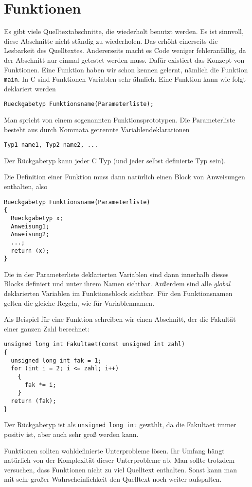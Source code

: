 \section{Funktionen}

Es gibt viele Quelltextabschnitte, die wiederholt benutzt werden.
Es ist sinnvoll, diese Abschnitte nicht ständig zu wiederholen.
Das erhöht einerseits die Lesbarkeit des Quelltextes.
Andererseits macht es Code weniger fehleranfällig, da der Abschnitt nur einmal getestet werden muss.
Dafür existiert das Konzept von Funktionen.
Eine Funktion haben wir schon kennen gelernt, nämlich die Funktion \verb|main|. 
In C sind Funktionen Variablen sehr ähnlich.
Eine Funktion kann wie folgt deklariert werden
\begin{lstlisting}
Rueckgabetyp Funktionsname(Parameterliste);
\end{lstlisting}
Man spricht von einem sogenannten Funktionsprototypen.
Die Parameterliste besteht aus durch Kommata getrennte Variablendeklarationen
\begin{lstlisting}
Typ1 name1, Typ2 name2, ...
\end{lstlisting}
Der Rückgabetyp kann jeder C Typ (und jeder selbst definierte Typ sein).

Die Definition einer Funktion muss dann natürlich einen Block von Anweisungen enthalten, also
\begin{lstlisting}
Rueckgabetyp Funktionsname(Parameterliste)
{
  Rueckgabetyp x;
  Anweisung1;
  Anweisung2;
  ...;
  return (x);
}
\end{lstlisting}
Die in der Parameterliste deklarierten Variablen sind dann innerhalb dieses Blocks definiert und unter ihrem Namen sichtbar.
Außerdem sind alle \emph{global} deklarierten Variablen im Funktionsblock sichtbar.
Für den Funktionsnamen gelten die gleiche Regeln, wie für Variablennamen.

Als Beispiel für eine Funktion schreiben wir einen Abschnitt, der die Fakultät einer ganzen Zahl berechnet:
\begin{lstlisting}
unsigned long int Fakultaet(const unsigned int zahl)
{
  unsigned long int fak = 1;
  for (int i = 2; i <= zahl; i++)
    {
      fak *= i;
    }
  return (fak);
}
\end{lstlisting}
Der Rückgabetyp ist als \verb|unsigned long int| gewählt, da die Fakultaet immer positiv ist, aber auch sehr groß werden kann.

Funktionen sollten wohldefinierte Unterprobleme lösen.
Ihr Umfang hängt natürlich von der Komplexität dieser Unterprobleme ab.
Man sollte trotzdem versuchen, dass Funktionen nicht zu viel Quelltext enthalten.
Sonst kann man mit sehr großer Wahrscheinlichkeit den Quelltext noch weiter aufspalten.

